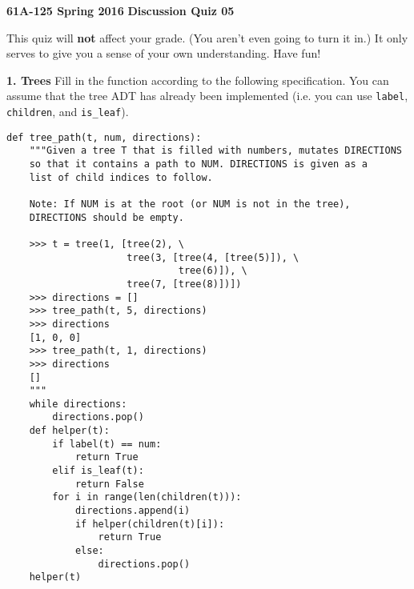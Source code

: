 \documentclass[11pt]{article}
\begin{document}
\textbf{61A-125 Spring 2016}\newline
\textbf{Discussion Quiz 05}\newline

This quiz will \textbf{not} affect your grade. (You aren't even going to turn it in.)\newline
It only serves to give you a sense of your own understanding. Have fun!\newline

\textbf{1. Trees}\newline
Fill in the function according to the following specification. You can assume that the tree ADT has already been implemented (i.e. you can use \lstinline{label}, \lstinline{children}, and \lstinline{is_leaf}).

\begin{lstlisting}
def tree_path(t, num, directions):
    """Given a tree T that is filled with numbers, mutates DIRECTIONS
    so that it contains a path to NUM. DIRECTIONS is given as a
    list of child indices to follow.
    
    Note: If NUM is at the root (or NUM is not in the tree), 
    DIRECTIONS should be empty.
    
    >>> t = tree(1, [tree(2), \
                     tree(3, [tree(4, [tree(5)]), \
                              tree(6)]), \
                     tree(7, [tree(8)])])
    >>> directions = []
    >>> tree_path(t, 5, directions)
    >>> directions
    [1, 0, 0]
    >>> tree_path(t, 1, directions)
    >>> directions
    []
    """
    while directions:
        directions.pop()
    def helper(t):
        if label(t) == num:
            return True
        elif is_leaf(t):
            return False
        for i in range(len(children(t))):
            directions.append(i)
            if helper(children(t)[i]):
                return True
            else:
                directions.pop()
    helper(t)
\end{lstlisting}
\end{document}
